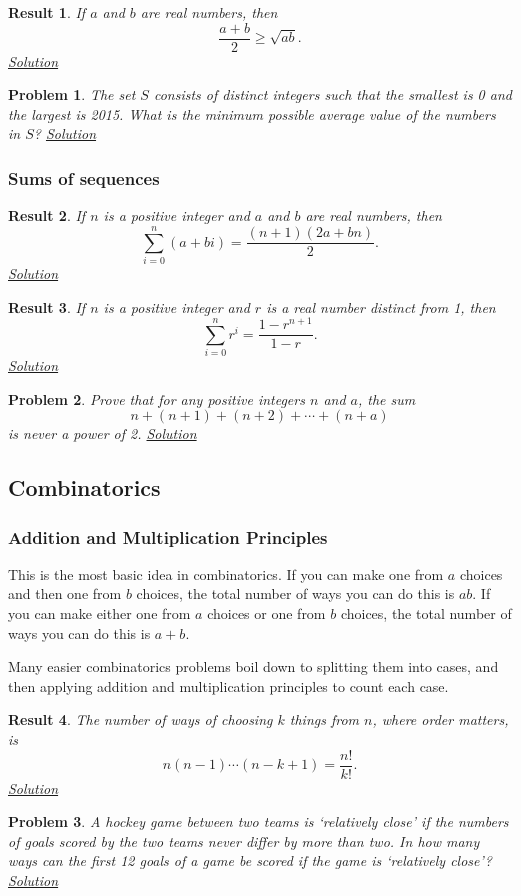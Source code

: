 \documentclass{amsart}
\newtheorem{problem}{Problem}[subsubsection]
\newtheorem{result}{Result}[subsubsection]
\begin{document}
\begin{result}\label{r:b:a:ineq:1}
  If $a$ and $b$ are real numbers, then \[\frac{a+b}2\ge\sqrt{ab}.\]
  \hyperlink{sr:b:a:ineq:1}{Solution}
\end{result}

\begin{problem}\label{p:b:a:ineq:1}
  The set $S$ consists of distinct integers such that the smallest is 0 and the
  largest is 2015. What is the minimum possible average value of the numbers in
  $S$?
  \hyperlink{sp:b:a:ineq:1}{Solution}
\end{problem}
\subsubsection{Sums of sequences}
\begin{result}\label{r:b:a:sums:1}
  If $n$ is a positive integer and $a$ and $b$ are real numbers, then
  \[\sum_{i=0}^n(a+bi)=\frac{(n+1)(2a+bn)}2.\]
  \hyperlink{sr:b:a:sums:1}{Solution}
\end{result}
\begin{result}\label{r:b:a:sums:2}
  If $n$ is a positive integer and $r$ is a real number distinct from 1, then
  \[\sum_{i=0}^n r^i=\frac{1-r^{n+1}}{1-r}.\]
  \hyperlink{sr:b:a:sums:2}{Solution}
\end{result}
\begin{problem}\label{p:b:a:sums:1}
  Prove that for any positive integers $n$ and $a$, the sum
  \[n+(n+1)+(n+2)+\cdots+(n+a)\] is never a power of 2.
  \hyperlink{sp:b:a:sums:1}{Solution}
\end{problem}
\subsection{Combinatorics}
\subsubsection{Addition and Multiplication Principles}
This is the most basic idea in combinatorics. If you can make one from $a$
choices and then one from $b$ choices, the total number of ways you can do this
is $ab$. If you can make either one from $a$ choices or one from $b$ choices,
the total number of ways you can do this is $a+b$.

Many easier combinatorics problems boil down to splitting them into cases, and
then applying addition and multiplication principles to count each case.
\begin{result}\label{r:b:c:am:1}
  The number of ways of choosing $k$ things from $n$, where order matters, is
  \[n(n-1)\cdots(n-k+1)=\frac{n!}{k!}.\]
  \hyperlink{sr:b:c:am:1}{Solution}
\end{result}
\begin{problem}\label{p:b:c:am:1}
  A hockey game between two teams is `relatively close' if the numbers of goals
  scored by the two teams never differ by more than two. In how many ways can
  the first 12 goals of a game be scored if the game is `relatively close'?
  \hyperlink{sp:b:c:am:1}{Solution}
\end{problem}
\end{document}
